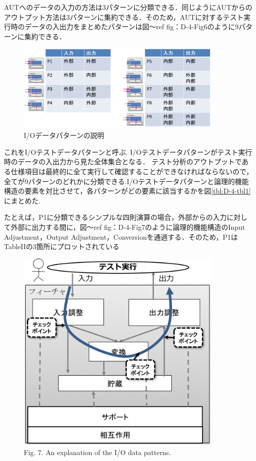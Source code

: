 \documentclass[a4paper,12pt]{jreport}
\begin{document}
AUTへのデータの入力の方法は3パターンに分類できる．同じようにAUTからのアウトプット方法は3パターンに集約できる．そのため，AUTに対するテスト実行時のデータの入出力をまとめたパターンは図〜ref {fig：D-4-Fig6}のように9パターンに集約できる．
    \begin{figure}[htbp]
  \begin{center}
  \includegraphics[width=10cm]{./image/D-3-Fig5.png}
  \caption{I/Oデータパターンの説明}
  \label{fig:D-4-Fig6}
  \end{center}
   \end{figure}

これをI/Oテストデータパターンと呼ぶ.
I/Oテストデータパターンがテスト実行時のデータの入出力から見た全体集合となる．
テスト分析のアウトプットである仕様項目は最終的に全て実行して確認することができなければならないので，全てが9パターンのどれかに分類できる.I/Oテストデータパターンと論理的機能構造の要素を対比させて，各パターンがどの要素に該当するかを図\ref{tbl:D-4-tbl1}にまとめた.


たとえば，P1に分類できるシンプルな四則演算の場合，外部からの入力に対して外部に出力する間に，図〜ref {fig：D-4-Fig7}のように論理的機能構造のInput Adjustment，Output Adjustment，Conversionを通過する．そのため，P1はTableIIの3箇所にプロットされている

   \begin{figure}[htbp]
  \begin{center}
  \includegraphics[width=10cm]{./image/D-4-Fig7.png}
  \caption{Fig. 7. An explanation of the I/O data patterns.}
  \label{fig:D-4-Fig7}
  \end{center}
   \end{figure}
\end{document}

